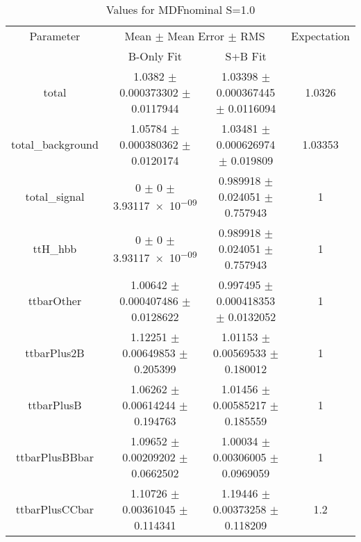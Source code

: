 \begin{table}
\centering
\caption{Values for MDFnominal S=1.0}
\begin{tabular}{cccc}
\toprule
Parameter & \multicolumn{2}{c}{Mean $\pm$ Mean Error $\pm$ RMS} & Expectation\\
 & B-Only Fit & S+B Fit & \\
\midrule
total & \num{1.0382} $\pm$ \num{0.000373302} $\pm$ \num{0.0117944} & \num{1.03398} $\pm$ \num{0.000367445} $\pm$ \num{0.0116094} & \num{1.0326}\\
total\_background & \num{1.05784} $\pm$ \num{0.000380362} $\pm$ \num{0.0120174} & \num{1.03481} $\pm$ \num{0.000626974} $\pm$ \num{0.019809} & \num{1.03353}\\
total\_signal & \num{0} $\pm$ \num{0} $\pm$ \num{3.93117e-09} & \num{0.989918} $\pm$ \num{0.024051} $\pm$ \num{0.757943} & \num{1}\\
ttH\_hbb & \num{0} $\pm$ \num{0} $\pm$ \num{3.93117e-09} & \num{0.989918} $\pm$ \num{0.024051} $\pm$ \num{0.757943} & \num{1}\\
ttbarOther & \num{1.00642} $\pm$ \num{0.000407486} $\pm$ \num{0.0128622} & \num{0.997495} $\pm$ \num{0.000418353} $\pm$ \num{0.0132052} & \num{1}\\
ttbarPlus2B & \num{1.12251} $\pm$ \num{0.00649853} $\pm$ \num{0.205399} & \num{1.01153} $\pm$ \num{0.00569533} $\pm$ \num{0.180012} & \num{1}\\
ttbarPlusB & \num{1.06262} $\pm$ \num{0.00614244} $\pm$ \num{0.194763} & \num{1.01456} $\pm$ \num{0.00585217} $\pm$ \num{0.185559} & \num{1}\\
ttbarPlusBBbar & \num{1.09652} $\pm$ \num{0.00209202} $\pm$ \num{0.0662502} & \num{1.00034} $\pm$ \num{0.00306005} $\pm$ \num{0.0969059} & \num{1}\\
ttbarPlusCCbar & \num{1.10726} $\pm$ \num{0.00361045} $\pm$ \num{0.114341} & \num{1.19446} $\pm$ \num{0.00373258} $\pm$ \num{0.118209} & \num{1.2}\\
\bottomrule
\end{tabular}
\end{table}